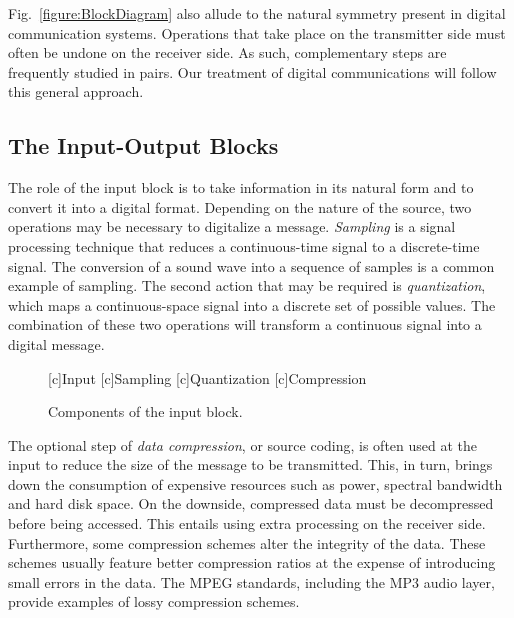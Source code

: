 Fig.~\ref{figure:BlockDiagram} also allude to the natural symmetry present in digital communication systems.
Operations that take place on the transmitter side must often be undone on the receiver side.
As such, complementary steps are frequently studied in pairs.
Our treatment of digital communications will follow this general approach.


\subsection{The Input-Output Blocks}

The role of the input block is to take information in its natural form and to convert it into a digital format.
Depending on the nature of the source, two operations may be necessary to digitalize a message.
\emph{Sampling} is a signal processing technique that reduces a continuous-time signal to a discrete-time signal.
The conversion of a sound wave into a sequence of samples is a common example of sampling.
The second action that may be required is \emph{quantization}, which maps a continuous-space signal into a discrete set of possible values.
The combination of these two operations will transform a continuous signal into a digital message.

\begin{figure}[htbp]
\begin{center}
\begin{psfrags}
[c]{Input}
[c]{Sampling}
[c]{Quantization}
[c]{Compression}
\end{psfrags}
\end{center}
\caption{Components of the input block.}
\label{figure:BlockInput}
\end{figure}

The optional step of \emph{data compression}, or source coding, is often used at the input to reduce the size of the message to be transmitted.
This, in turn, brings down the consumption of expensive resources such as power, spectral bandwidth and hard disk space.
On the downside, compressed data must be decompressed before being accessed.
This entails using extra processing on the receiver side.
Furthermore, some compression schemes alter the integrity of the data.
These schemes usually feature better compression ratios at the expense of introducing small errors in the data.
The MPEG standards, including the MP3 audio layer, provide examples of lossy compression schemes.

